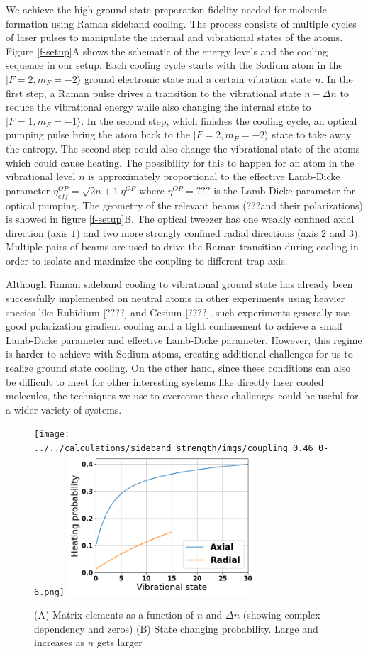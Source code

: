 \documentclass[aps,prl,twocolumn,groupedaddress]{revtex4-1}
\begin{document}
We achieve the high ground state preparation fidelity needed for molecule formation
using Raman sideband cooling. The process consists of multiple cycles of laser pulses
to manipulate the internal and vibrational states of the atoms.
Figure \ref{f-setup}A shows the schematic of the energy levels and the cooling sequence
in our setup.
Each cooling cycle starts with the Sodium atom in the $|F=2, m_F=-2\rangle$
ground electronic state and a certain vibration state $n$.
In the first step, a Raman pulse drives a transition to the vibrational state $n-\Delta n$
to reduce the vibrational energy while also changing the internal state to $|F=1, m_F=-1\rangle$.
In the second step, which finishes the cooling cycle,
an optical pumping pulse bring the atom back to the $|F=2, m_F=-2\rangle$ state to take away
the entropy. The second step could also change the vibrational state of the atoms which
could cause heating. The possibility for this to happen for an atom in the vibrational level $n$
is approximately proportional to the effective Lamb-Dicke parameter
$\eta^{OP}_{eff}=\sqrt{2n+1}\eta^{OP}$ where $\eta^{OP}=???$ is the Lamb-Dicke parameter for
optical pumping.
The geometry of the relevant beams (???and their polarizations) is showed in figure \ref{f-setup}B.
The optical tweezer has one weakly confined axial direction (axis $1$) and
two more strongly confined radial directions (axis $2$ and $3$).
Multiple pairs of beams are used to drive the Raman transition during cooling in order to
isolate and maximize the coupling to different trap axis.

Although Raman sideband cooling to vibrational ground state has already been successfully
implemented on neutral atoms in other experiments using heavier species like Rubidium [????]
and Cesium [????], such experiments generally use good polarization gradient cooling
and a tight confinement to achieve a small Lamb-Dicke parameter and effective Lamb-Dicke parameter.
However, this regime is harder to achieve with Sodium atoms, creating additional challenges for
us to realize ground state cooling. On the other hand, since these conditions can also be difficult
to meet for other interesting systems like directly laser cooled molecules, the techniques we
use to overcome these challenges could be useful for a wider variety of systems.

\begin{figure}
  \texttt{[image: ../../calculations/sideband\_strength/imgs/coupling\_0.46\_0-6.png]}
  \includegraphics[width=7cm]{imgs/heating_op.png}
  \caption{(A) Matrix elements as a function of $n$ and $\Delta n$ (showing complex dependency and zeros) (B) State changing probability. Large and increases as $n$ gets larger
    \label{f-ld}}
\end{figure}
\end{document}
